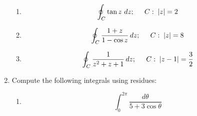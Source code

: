 \documentclass[fleqn]{article}
\begin{document}
\begin{enumerate}
\begin{enumerate}
      \item \[
      \oint_{C}\tan z\,\,dz;\hspace{0.2in}C:\;\left| z\right| =2
      \]
      
      \item \[
      \oint_{C}\frac{1+z}{1-\cos z}\,dz;\hspace{0.2in}C:\;\left| z\right| =8
      \]
      
      \item \[
      \oint_{C}\frac{1}{z^{2}+z+1}\,dz;\hspace{0.2in}C:\;\left| z-1\right| =\frac{3}{2}
      \]
    \end{enumerate}
    
    \item Compute the following integrals using residues:
    
    \begin{enumerate}
      \item \[
      \int_{0}^{2\pi }\frac{d\theta }{5+3\cos \theta }
      \]


\end{enumerate}
\end{enumerate}
\end{document}
